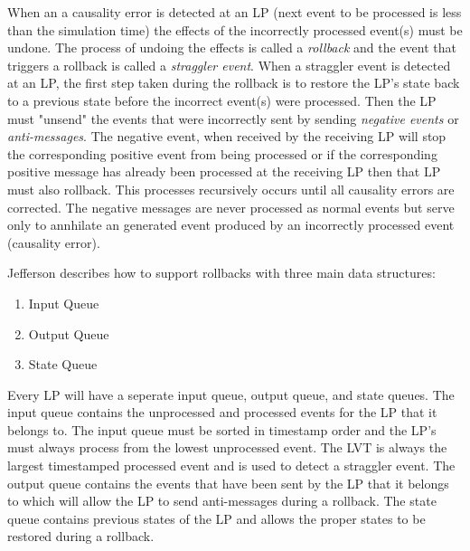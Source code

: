 \documentclass[11pt]{book}
\begin{document}
When an a causality error is detected at an LP (next event to be processed is less than the
simulation time) the effects of the incorrectly processed event(s) must be undone. The process
of undoing the effects is called a \emph{rollback} and the event that triggers a rollback
is called a \emph{straggler event}. When a straggler event is detected at an LP, the first
step taken during the rollback is to restore the LP's state back to a previous state before
the incorrect event(s) were processed. Then the LP must "unsend" the events that were
incorrectly sent by sending \emph{negative events} or \emph{anti-messages}. The negative
event, when received by the receiving LP will stop the corresponding positive event from
being processed or if the corresponding positive message has already been processed at
the receiving LP then that LP must also rollback. This processes recursively occurs until
all causality errors are corrected. The negative messages are never processed as normal
events but serve only to annhilate an generated event produced by an incorrectly processed
event (causality error).

Jefferson\cite{jefferson-85} describes how to support rollbacks with three main data structures:

\begin{enumerate}
    \item Input Queue
    \item Output Queue
    \item State Queue
\end{enumerate}

\noindent
Every LP will have a seperate input queue, output queue, and state queues. The input
queue contains the unprocessed and processed events for the LP that it belongs to. The
input queue must be sorted in timestamp order and the LP's must always process from the
lowest unprocessed event. The LVT is always the largest timestamped processed event and
is used to detect a straggler event. The output queue contains the events that have been
sent by the LP that it belongs to which will allow the LP to send anti-messages during a
rollback. The state queue contains previous states of the LP and allows the proper states
to be restored during a rollback.
\end{document}
